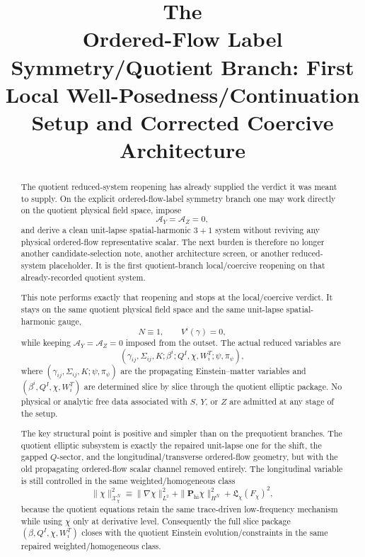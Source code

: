 \documentclass[11pt]{article}
\title{\textbf{The \TheoryName{}}\\[0.4em]
\large Ordered-Flow Label Symmetry/Quotient Branch: First Local Well-Posedness/Continuation Setup and Corrected Coercive Architecture}
\author{}
\date{}
\begin{document}
\maketitle

\begin{abstract}
The quotient reduced-system reopening has already supplied the verdict it was meant to supply. On the explicit ordered-flow-label symmetry branch one may work directly on the quotient physical field space, impose
\[
\mathcal A_Y=\mathcal A_Z=0,
\]
and derive a clean unit-lapse spatial-harmonic \(3+1\) system without reviving any physical ordered-flow representative scalar. The next burden is therefore no longer another candidate-selection note, another architecture screen, or another reduced-system placeholder. It is the first quotient-branch local/coercive reopening on that already-recorded quotient system.

This note performs exactly that reopening and stops at the local/coercive verdict. It stays on the same quotient physical field space and the same unit-lapse spatial-harmonic gauge,
\[
N\equiv 1,
\qquad
V^i(\gamma)=0,
\]
while keeping \(\mathcal A_Y=\mathcal A_Z=0\) imposed from the outset. The actual reduced variables are
\[
(\gamma_{ij},\Sigma_{ij},K;\beta^i;Q^I,\chi,W_i^T;\psi,\pi_\psi),
\]
where \((\gamma_{ij},\Sigma_{ij},K;\psi,\pi_\psi)\) are the propagating Einstein--matter variables and \((\beta^i,Q^I,\chi,W_i^T)\) are determined slice by slice through the quotient elliptic package. No physical or analytic free data associated with \(S\), \(Y\), or \(Z\) are admitted at any stage of the setup.

The key structural point is positive and simpler than on the prequotient branches. The quotient elliptic subsystem is exactly the repaired unit-lapse one for the shift, the gapped \(Q\)-sector, and the longitudinal/transverse ordered-flow geometry, but with the old propagating ordered-flow scalar channel removed entirely. The longitudinal variable is still controlled in the same weighted/homogeneous class
\[
\|\chi\|_{\mathcal X_\chi^N}^2
\equiv
\|\nabla\chi\|_{L^2}^2
+\|\mathbf P_{\mathrm{hi}}\chi\|_{H^N}^2
+\mathfrak L_\chi(F_\chi)^2,
\]
because the quotient equations retain the same trace-driven low-frequency mechanism while using \(\chi\) only at derivative level. Consequently the full slice package \((\beta,Q^I,\chi,W_i^T)\) closes with the quotient Einstein evolution/constraints in the same repaired weighted/homogeneous class.


\end{abstract}
\end{document}
